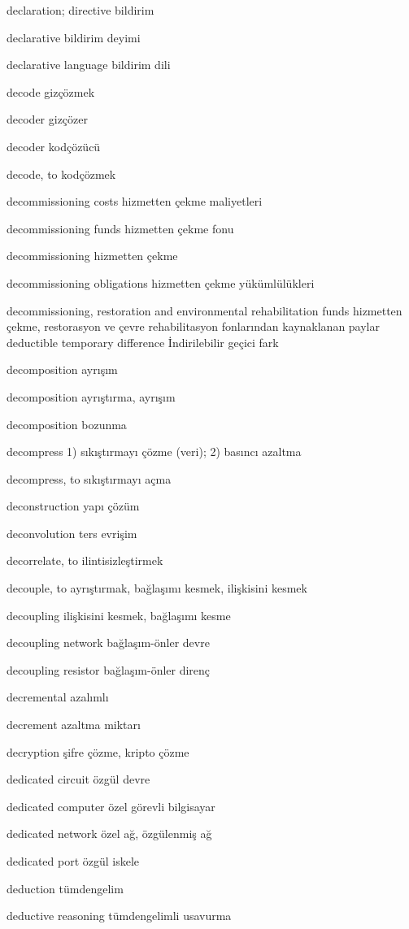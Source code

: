 \documentclass[12pt,fleqn]{article}\usepackage{../../common}
\begin{document}
declaration; directive bildirim

declarative bildirim deyimi

declarative language bildirim dili

decode gizçözmek

decoder gizçözer

decoder kodçözücü

decode, to kodçözmek

decommissioning costs hizmetten çekme maliyetleri

decommissioning funds hizmetten çekme fonu

decommissioning hizmetten çekme

decommissioning obligations hizmetten çekme yükümlülükleri

decommissioning, restoration and environmental rehabilitation funds hizmetten çekme, restorasyon ve çevre rehabilitasyon fonlarından kaynaklanan paylar deductible temporary difference İndirilebilir geçici fark

decomposition ayrışım

decomposition ayrıştırma, ayrışım

decomposition bozunma

decompress 1) sıkıştırmayı çözme (veri); 2) basıncı azaltma

decompress, to sıkıştırmayı açma

deconstruction yapı çözüm

deconvolution ters evrişim

decorrelate, to ilintisizleştirmek

decouple, to ayrıştırmak, bağlaşımı kesmek, ilişkisini kesmek

decoupling ilişkisini kesmek, bağlaşımı kesme

decoupling network bağlaşım-önler devre

decoupling resistor bağlaşım-önler direnç

decremental azalımlı

decrement azaltma miktarı

decryption şifre çözme, kripto çözme

dedicated circuit özgül devre

dedicated computer özel görevli bilgisayar

dedicated network özel ağ, özgülenmiş ağ

dedicated port özgül iskele

deduction tümdengelim

deductive reasoning tümdengelimli usavurma
\end{document}
